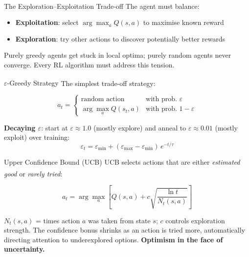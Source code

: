 \begin{v3topic}{The Exploration--Exploitation Trade-off}
    The agent must balance:\textsuperscript{\cite[][pp.~338--339]{hurbansGrokkingArtificialIntelligence2020}}
    \begin{itemize}
        \item \textbf{Exploitation}: select $\arg\max_a Q(s,a)$ to maximise
              known reward
        \item \textbf{Exploration}: try other actions to discover potentially
              better rewards
    \end{itemize}

    Purely greedy agents get stuck in local optima; purely random agents
    never converge. Every RL algorithm must address this tension.

\end{v3topic}
\begin{v3topic}{$\varepsilon$-Greedy Strategy}
    The simplest trade-off
    strategy:\textsuperscript{\cite[][p.~339]{hurbansGrokkingArtificialIntelligence2020}}

    \begin{equation}
        a_t = \begin{cases}
            \text{random action} & \text{with prob.\ } \varepsilon \\
            \arg\max_a Q(s_t,a) & \text{with prob.\ } 1{-}\varepsilon
        \end{cases}
    \end{equation}

    \textbf{Decaying $\varepsilon$}: start at $\varepsilon \approx 1.0$ (mostly
    explore) and anneal to $\varepsilon \approx 0.01$ (mostly exploit) over
    training:
    \[ \varepsilon_t = \varepsilon_{\min}
       + (\varepsilon_{\max} - \varepsilon_{\min})\,e^{-t/\tau} \]

\end{v3topic}
\begin{v3topic}{Upper Confidence Bound (UCB)}
    UCB selects actions that are either \emph{estimated good} or
    \emph{rarely tried}:\textsuperscript{\cite[][Ch.~2]{suttonReinforcementLearningIntroduction2018}}

    \begin{equation}
        a_t = \arg\max_a \left[ Q(s,a) + c\sqrt{\frac{\ln t}{N_t(s,a)}} \right]
    \end{equation}

    $N_t(s,a)$ = times action $a$ was taken from state $s$; $c$ controls
    exploration strength. The confidence bonus shrinks as an action is tried
    more, automatically directing attention to underexplored options.
    \textbf{Optimism in the face of uncertainty.}

\end{v3topic}
